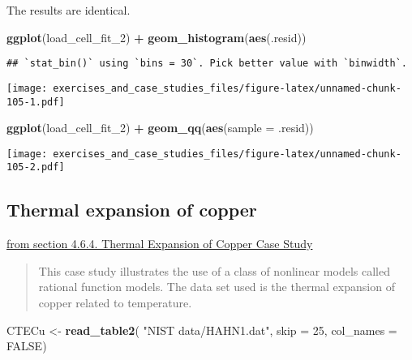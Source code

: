 \documentclass[]{book}
\newenvironment{Shaded}{\begin{snugshade}}{\end{snugshade}}
\newcommand{\DataTypeTok}[1]{\textcolor[rgb]{0.13,0.29,0.53}{#1}}
\newcommand{\DecValTok}[1]{\textcolor[rgb]{0.00,0.00,0.81}{#1}}
\newcommand{\KeywordTok}[1]{\textcolor[rgb]{0.13,0.29,0.53}{\textbf{#1}}}
\newcommand{\NormalTok}[1]{#1}
\newcommand{\OperatorTok}[1]{\textcolor[rgb]{0.81,0.36,0.00}{\textbf{#1}}}
\newcommand{\OtherTok}[1]{\textcolor[rgb]{0.56,0.35,0.01}{#1}}
\newcommand{\StringTok}[1]{\textcolor[rgb]{0.31,0.60,0.02}{#1}}
\theoremstyle{definition}
\theoremstyle{definition}
\theoremstyle{definition}
\theoremstyle{remark}
\begin{document}
The results are identical.

\begin{Shaded}
\begin{Highlighting}[]
\KeywordTok{ggplot}\NormalTok{(load_cell_fit_}\DecValTok{2}\NormalTok{) }\OperatorTok{+}
\StringTok{  }\KeywordTok{geom_histogram}\NormalTok{(}\KeywordTok{aes}\NormalTok{(.resid))}
\end{Highlighting}
\end{Shaded}

\begin{verbatim}
## `stat_bin()` using `bins = 30`. Pick better value with `binwidth`.
\end{verbatim}

\texttt{[image: exercises\_and\_case\_studies\_files/figure-latex/unnamed-chunk-105-1.pdf]}

\begin{Shaded}
\begin{Highlighting}[]
\KeywordTok{ggplot}\NormalTok{(load_cell_fit_}\DecValTok{2}\NormalTok{) }\OperatorTok{+}
\StringTok{  }\KeywordTok{geom_qq}\NormalTok{(}\KeywordTok{aes}\NormalTok{(}\DataTypeTok{sample =}\NormalTok{ .resid))}
\end{Highlighting}
\end{Shaded}

\texttt{[image: exercises\_and\_case\_studies\_files/figure-latex/unnamed-chunk-105-2.pdf]}

\hypertarget{thermal-expansion-of-copper}{%
\subsection{Thermal expansion of
copper}\label{thermal-expansion-of-copper}}

\href{https://www.itl.nist.gov/div898/handbook/pmd/section6/pmd64.htm}{from
section 4.6.4. Thermal Expansion of Copper Case Study}

\begin{quote}
This case study illustrates the use of a class of nonlinear models
called rational function models. The data set used is the thermal
expansion of copper related to temperature.
\end{quote}

\begin{Shaded}
\begin{Highlighting}[]
\NormalTok{CTECu <-}\StringTok{ }\KeywordTok{read_table2}\NormalTok{(}
  \StringTok{"NIST data/HAHN1.dat"}\NormalTok{, }\DataTypeTok{skip =} \DecValTok{25}\NormalTok{, }\DataTypeTok{col_names =} \OtherTok{FALSE}\NormalTok{) }
\end{Highlighting}
\end{Shaded}
\end{document}
